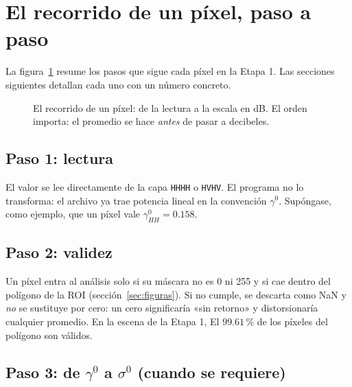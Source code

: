 \documentclass[11pt,a4paper]{article}
\begin{document}
\section{El recorrido de un píxel, paso a paso}
\label{sec:recorrido}

La figura~\ref{fig:recorrido} resume los pasos que sigue cada píxel en la Etapa 1. Las secciones siguientes
detallan cada uno con un número concreto.

\begin{figure}[htbp]
\centering
{}
\caption{El recorrido de un píxel: de la lectura a la escala en dB. El orden importa: el promedio se hace
\emph{antes} de pasar a decibeles.}
\label{fig:recorrido}
\end{figure}

\subsection{Paso 1: lectura}

El valor se lee directamente de la capa \texttt{HHHH} o \texttt{HVHV}. El programa no lo transforma: el
archivo ya trae potencia lineal en la convención $\gamma^0$. Supóngase, como ejemplo, que un píxel vale
$\gamma^0_{HH}=0.158$.

\subsection{Paso 2: validez}

Un píxel entra al análisis solo si su máscara no es 0 ni 255 y si cae dentro del polígono de la ROI
(sección~\ref{sec:figuras}). Si no cumple, se descarta como NaN y \emph{no} se sustituye por cero: un cero
significaría «sin retorno» y distorsionaría cualquier promedio. En la escena de la Etapa 1, El $99.61\,\mathrm{\%}$ de los
píxeles del polígono son válidos.

\subsection{Paso 3: de $\gamma^0$ a $\sigma^0$ (cuando se requiere)}
\end{document}
